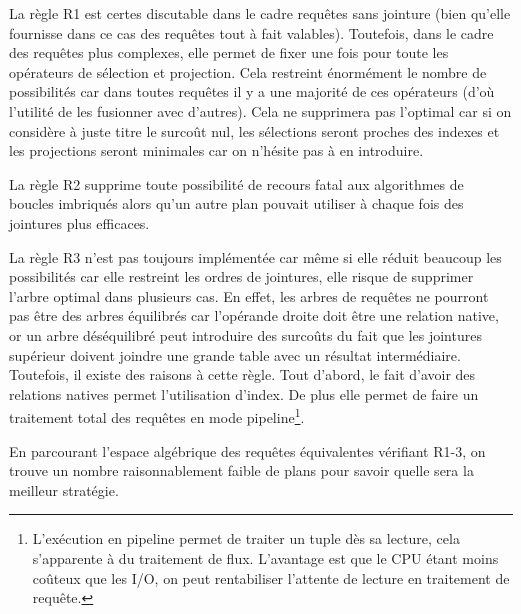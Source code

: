 La règle R1 est certes discutable dans le cadre requêtes sans jointure (bien qu'elle fournisse dans ce cas des requêtes tout à fait valables). Toutefois, dans le cadre des requêtes plus complexes, elle permet de fixer une fois pour toute les opérateurs de sélection et projection. Cela restreint énormément le nombre de possibilités car dans toutes requêtes il y a une majorité de ces opérateurs (d'où l'utilité de les fusionner avec d'autres). Cela ne supprimera pas l'optimal car si on considère à juste titre le surcoût nul, les sélections seront proches des indexes et les projections seront minimales car on n'hésite pas à en introduire.

La règle R2 supprime toute possibilité de recours fatal aux algorithmes de boucles imbriqués alors qu'un autre plan pouvait utiliser à chaque fois des jointures plus efficaces.

La règle R3 n'est pas toujours implémentée car même si elle réduit beaucoup les possibilités car elle restreint les ordres de jointures, elle risque de supprimer l'arbre optimal dans plusieurs cas. En effet, les arbres de requêtes ne pourront pas être des arbres équilibrés car l'opérande droite doit être une relation native, or un arbre déséquilibré peut introduire des surcoûts du fait que les jointures supérieur doivent joindre une grande table avec un résultat intermédiaire. Toutefois, il existe des raisons à cette règle. Tout d'abord, le fait d'avoir des relations natives permet l'utilisation d'index. De plus elle permet de faire un traitement total des requêtes en mode pipeline\footnote{L'exécution en pipeline permet de traiter un tuple dès sa lecture, cela s'apparente à du traitement de flux. L'avantage est que le CPU étant moins coûteux que les I/O, on peut rentabiliser l'attente de lecture en traitement de requête.}.

En parcourant l'espace algébrique des requêtes équivalentes vérifiant R1-3, on trouve un nombre raisonnablement faible de plans pour savoir quelle sera la meilleur stratégie. 

